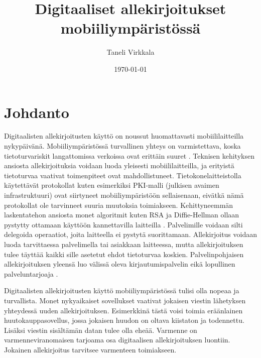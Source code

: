 \documentclass[finnish]{tktltiki2}
\title{Digitaaliset allekirjoitukset mobiiliympäristössä}
\author{Taneli Virkkala}
\date{\today}
\theoremstyle{definition}
\theoremstyle{remark}
\begin{document}

\frontmatter      %

\maketitle        %
\makeabstract     %

\tableofcontents  %


\mainmatter       %

\section{Johdanto}


Digitaalisten allekirjoitusten käyttö on noussut huomattavasti mobiililaitteilla nykypäivänä. Mobiiliympäristössä turvallinen yhteys on varmistettava, koska tietoturvariskit langattomissa verkoissa ovat erittäin suuret \cite{enti}. Teknisen kehityksen ansiosta allekirjoituksia voidaan luoda yleisesti mobiililaitteilla, ja erityistä tietoturvaa vaativat toimenpiteet ovat mahdollistuneet. Tietokonelaitteistolla käytettävät protokollat kuten esimerkiksi PKI-malli (julkisen avaimen infrastruktuuri) ovat siirtyneet mobiiliympäristöön sellaisenaan, eivätkä nämä protokollat ole tarvinneet suuria muutoksia toimiakseen. Kehittyneemmän laskentatehon ansiosta monet algoritmit kuten RSA ja Diffie-Hellman ollaan pystytty ottamaan käyttöön kannettavilla laitteilla \cite{enti}. Palvelimille voidaan silti delegoida operaatiot, joita laitteella ei pystytä suorittamaan. Allekirjoitus voidaan luoda tarvittaessa palvelimella tai asiakkaan laitteessa, mutta allekirjoituksen tulee täyttää kaikki sille asetetut ehdot tietoturvaa koskien. Palvelinpohjaisen allekirjoituksen yleensä luo välissä oleva kirjautumispalvelin eikä lopullinen palveluntarjoaja \cite{proxy}.

Digitaalisten allekirjoitusten käyttö mobiiliympäristössä tulisi olla nopeaa ja turvallista. Monet nykyaikaiset sovellukset vaativat jokaisen viestin lähetyksen yhteydessä uuden allekirjoituksen. Esimerkkinä tästä voisi toimia eräänlainen huutokauppasovellus, jossa jokaisen huudon on oltava kiistaton ja todennettu. Lisäksi viestin sisältämän datan tulee olla eheää. Varmenne on varmenneviranomaisen tarjoama osa digitaalisen allekirjoituksen luontiin. Jokainen allekirjoitus tarvitsee varmenteen toimiakseen. \cite{proxy}
\end{document}
